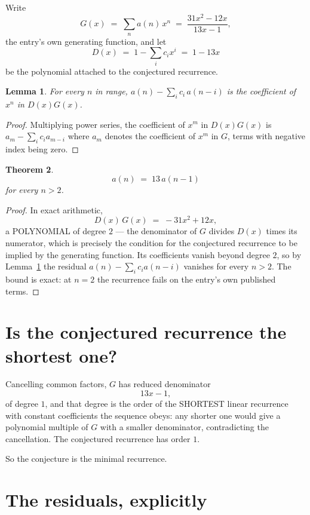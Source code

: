 \documentclass[11pt,a4paper]{article}
\theoremstyle{plain}
\newtheorem{theorem}{Theorem}
\newtheorem{lemma}[theorem]{Lemma}
\theoremstyle{definition}
\begin{document}
Write
\[
G(x)\;=\;\sum_{n}a(n)\,x^{n}\;=\;\frac{31 x^{2} - 12 x}{13 x - 1},
\]
the entry's own generating function, and let
\[
D(x)\;=\;1-\sum_i c_i x^{i}\;=\;1 - 13 x
\]
be the polynomial attached to the conjectured recurrence.

\begin{lemma}\label{lem:key}
For every $n$ in range, $a(n)-\sum_i c_i\,a(n-i)$ is the coefficient of $x^{n}$ in
$D(x)G(x)$.
\end{lemma}

\begin{proof}
Multiplying power series, the coefficient of $x^{m}$ in $D(x)G(x)$ is
$a_m-\sum_i c_i a_{m-i}$ where $a_m$ denotes the coefficient of $x^{m}$ in $G$, terms with
negative index being zero.
\end{proof}

\begin{theorem}
\[
a(n)\;=\;13\,a(n-1)
\]
for every $n>2$.
\end{theorem}

\begin{proof}
In exact arithmetic,
\[
D(x)\,G(x)\;=\;- 31 x^{2} + 12 x,
\]
a POLYNOMIAL of degree $2$ --- the denominator of $G$ divides $D(x)$ times its numerator,
which is precisely the condition for the conjectured recurrence to be implied by the
generating function. Its coefficients vanish beyond degree $2$, so by
Lemma~\ref{lem:key} the residual $a(n)-\sum_ic_ia(n-i)$ vanishes for every
$n>2$. The bound is exact: at $n=2$ the recurrence fails on the entry's own published terms.
\end{proof}

\section{Is the conjectured recurrence the shortest one?}

Cancelling common factors, $G$ has reduced denominator
\[
13 x - 1,
\]
of degree $1$, and that degree is the order of the SHORTEST linear recurrence with
constant coefficients the sequence obeys: any shorter one would give a polynomial multiple of
$G$ with a smaller denominator, contradicting the cancellation. The conjectured recurrence has
order $1$.

So the conjecture is the minimal recurrence.

\section{The residuals, explicitly}
\end{document}
